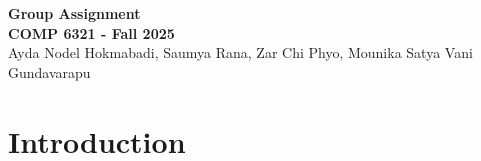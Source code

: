 \documentclass[11pt]{article}
\begin{document}
\begin{center}
{\Large \textbf{Group Assignment}}\\[8pt]
{\small \textbf{COMP 6321 - Fall 2025}}\\[5pt]
{\small Ayda Nodel Hokmabadi, Saumya Rana, Zar Chi Phyo, Mounika Satya Vani Gundavarapu}\\[3pt]
\end{center}

\vspace*{-2em}
\normalfont\normalsize


\begin{abstract}
In this assignment, we study  key machine learning concepts such as model selection, hyperparameter tuning, evaluation methods, and data imbalance influence performance and generalization, and discuss these concepts for our group project with a spam email classification system using both classical models (Naive Bayes and Logistic Regression) and modern transformer-based models (BERT and DistilBERT). By comparing simple linear models with large pre-trained language models, we highlight the trade-offs between bias, variance, and computational cost. Our analysis shows how tuning choices and evaluation metrics reveal under-fitting and over-fitting behaviors, and how transformers, despite their complexity, provide strong gains when properly tuned. 

\end{abstract}

\section{Introduction}
\end{document}
